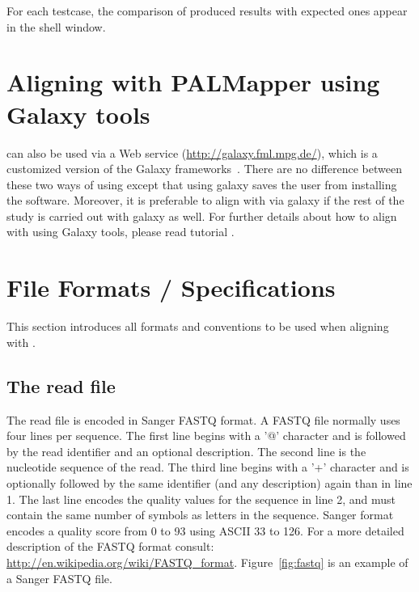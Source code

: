 \documentclass{article}
\begin{document}
\begin{enumerate}
For each testcase, the comparison of produced results with expected
ones appear in the shell window.
\end{enumerate}

\section{Aligning with PALMapper using Galaxy tools}
\label{sec:aligninggal}
\PALMapper{} can also be used via a Web service
(\url{http://galaxy.fml.mpg.de/}), which is a customized version of
the Galaxy frameworks~\cite{Galaxy1,Galaxy2,Galaxy3}. There are no
difference between these two ways of using \PALMapper{} except that using
galaxy saves the user from installing the software. Moreover, it is
preferable to align with \PALMapper{} via galaxy if the rest of the study is
carried out with galaxy as well. For further details about how to
align with \PALMapper{} using Galaxy tools, please read \PALMapper{}
tutorial \cite{Palmapper}.



\section{File Formats / Specifications}
\label{sec:formats}
This section introduces all formats and conventions to be used when
aligning with \PALMapper{}.

\subsection{The read file}
\label{sec:readfile}

The read file is encoded in Sanger FASTQ format. A FASTQ file normally
uses four lines per sequence. The first line begins with a '@'
character and is followed by the read identifier and an optional
description. The second line is the nucleotide sequence of the
read. The third line begins with a '+' character and is optionally
followed by the same identifier (and any description) again than in
line 1. The last line encodes the quality values for the sequence in
line 2, and must contain the same number of symbols as letters in the
sequence. Sanger format encodes a quality score from 0 to 93 using ASCII
33 to 126. For a more detailed description of the FASTQ format consult:
\url{http://en.wikipedia.org/wiki/FASTQ_format}. Figure~\ref{fig:fastq}
is an example of a Sanger FASTQ file.
\end{document}
